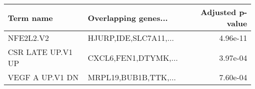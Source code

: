 \begin{tabular}{llr}
\toprule
        Term name &  Overlapping genes... &  Adjusted p-value \\
\midrule
        NFE2L2.V2 & HJURP,IDE,SLC7A11,... &          4.96e-11 \\
CSR LATE UP.V1 UP &  CXCL6,FEN1,DTYMK,... &          3.97e-04 \\
  VEGF A UP.V1 DN &  MRPL19,BUB1B,TTK,... &          7.60e-04 \\
\bottomrule
\end{tabular}
